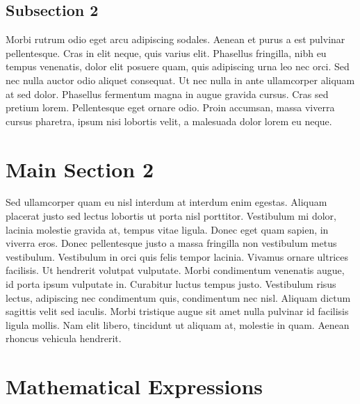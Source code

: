 \begin{sloppypar}

\subsection{Subsection 2}
Morbi rutrum odio eget arcu adipiscing sodales. Aenean et purus a est pulvinar pellentesque. Cras in elit neque, quis varius elit. Phasellus fringilla, nibh eu tempus venenatis, dolor elit posuere quam, quis adipiscing urna leo nec orci. Sed nec nulla auctor odio aliquet consequat. Ut nec nulla in ante ullamcorper aliquam at sed dolor. Phasellus fermentum magna in augue gravida cursus. Cras sed pretium lorem. Pellentesque eget ornare odio. Proin accumsan, massa viverra cursus pharetra, ipsum nisi lobortis velit, a malesuada dolor lorem eu neque.


\section{Main Section 2}

Sed ullamcorper quam eu nisl interdum at interdum enim egestas. Aliquam placerat justo sed lectus lobortis ut porta nisl porttitor. Vestibulum mi dolor, lacinia molestie gravida at, tempus vitae ligula. Donec eget quam sapien, in viverra eros. Donec pellentesque justo a massa fringilla non vestibulum metus vestibulum. Vestibulum in orci quis felis tempor lacinia. Vivamus ornare ultrices facilisis. Ut hendrerit volutpat vulputate. Morbi condimentum venenatis augue, id porta ipsum vulputate in. Curabitur luctus tempus justo. Vestibulum risus lectus, adipiscing nec condimentum quis, condimentum nec nisl. Aliquam dictum sagittis velit sed iaculis. Morbi tristique augue sit amet nulla pulvinar id facilisis ligula mollis. Nam elit libero, tincidunt ut aliquam at, molestie in quam. Aenean rhoncus vehicula hendrerit.

\section{Mathematical Expressions}\label{maths}




\end{sloppypar}
